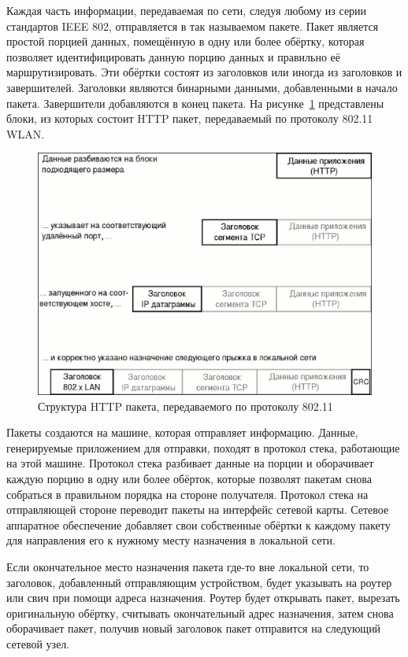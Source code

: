 Каждая часть информации, передаваемая по сети, следуя любому из серии стандартов
IEEE 802, отправляется в так называемом пакете. Пакет является простой порцией
данных, помещённую в одну или более обёртку, которая позволяет идентифицировать
данную порцию данных и правильно её маршрутизировать. Эти обёртки состоят из
заголовков или иногда из заголовков и завершителей. Заголовки являются бинарными
данными, добавленными в начало пакета. Завершители добавляются в конец пакета.
На рисунке~\ref{fig:wifi_packet_theory} представлены блоки, из которых состоит HTTP
пакет, передаваемый по протоколу 802.11 WLAN.

\begin{figure}
    \includegraphics[width=1\textwidth]{graphics/wifi_packet_theory.eps}
    \caption{Структура HTTP пакета, передаваемого по протоколу 802.11}
    \label{fig:wifi_packet_theory}
\end{figure}

Пакеты создаются на машине, которая отправляет информацию. Данные, генерируемые
приложением для отправки, походят в протокол стека, работающие на этой машине.
Протокол стека разбивает данные на порции и оборачивает каждую порцию в одну или
более обёрток, которые позволят пакетам снова собраться в правильном порядка на
стороне получателя. Протокол стека на отправляющей стороне переводит пакеты на
интерфейс сетевой карты.  Сетевое аппаратное обеспечение добавляет свои
собственные обёртки к каждому пакету для направления его к нужному месту
назначения в локальной сети.

Если окончательное место назначения пакета где-то вне локальной сети, то
заголовок, добавленный отправляющим устройством, будет указывать на роутер или
свич при помощи адреса назначения. Роутер будет открывать пакет, вырезать
оригинальную обёртку, считывать окончательный адрес назначения, затем снова
оборачивает пакет, получив новый заголовок пакет отправится на следующий сетевой
узел.

